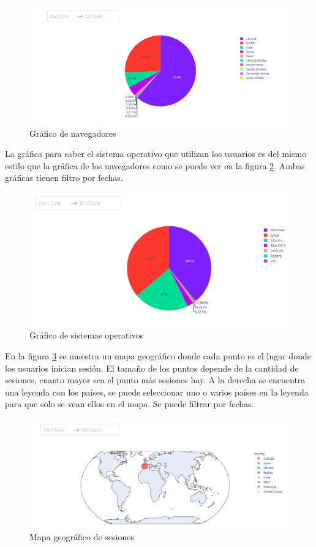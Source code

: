 \begin{figure}[H]
    \centering
    \includegraphics[width=19cm, keepaspectratio]{img/browser.png}
    \caption{Gráfico de navegadores}
    \label{fig:browser}
\end{figure}
\newpage
La gráfica para saber el sistema operativo que utilizan los usuarios es del mismo estilo que la gráfica de los navegadores como se puede ver en la figura \ref{fig:os}. Ambas gráficas tienen filtro por fechas.


\begin{figure}[H]
    \centering
    \includegraphics[width=17cm, keepaspectratio]{img/os.png}
    \caption{Gráfico de sistemas operativos}
    \label{fig:os}
\end{figure}
\newpage
En la figura \ref{fig:mundo} se muestra un mapa geográfico donde cada punto es el lugar donde los usuarios inician sesión. El tamaño de los puntos depende de la cantidad de sesiones, cuanto mayor sea el punto más sesiones hay. A la derecha se encuentra una leyenda con los países, se puede seleccionar uno o varios países en la leyenda para que solo se vean ellos en el mapa. Se puede filtrar por fechas.



\begin{figure}[H]
    \centering
    \includegraphics[width=17cm, keepaspectratio]{img/mundo.png}
    \caption{Mapa geográfico de sesiones}
    \label{fig:mundo}
\end{figure}


